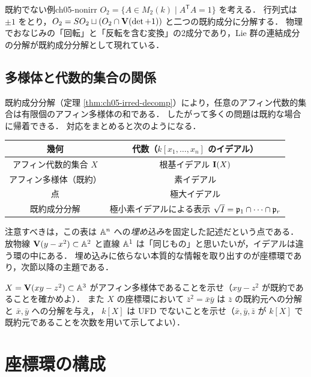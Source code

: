 \begin{myex}{既約でない例}{ch05-nonirr}
$O_2=\{A\in M_2(k)\mid A^{\mathsf T}A=1\}$ を考える．
行列式は $\pm1$ をとり，$O_2=SO_2\sqcup(O_2\cap\mathbf{V}(\det+1))$ と二つの既約成分に分解する．
物理でおなじみの「回転」と「反転を含む変換」の2成分であり，Lie 群の連結成分の分解が既約成分分解として現れている．
\end{myex}

\subsection{多様体と代数的集合の関係}

既約成分分解（定理 \ref{thm:ch05-irred-decomp}）により，任意のアフィン代数的集合は有限個のアフィン多様体の和である．
したがって多くの問題は既約な場合に帰着できる．
対応をまとめると次のようになる．
\begin{center}
\renewcommand{\arraystretch}{1.3}
\begin{tabular}{c|c}
幾何 & 代数（$k[x_1,\dots,x_n]$ のイデアル）\\ \hline
アフィン代数的集合 $X$ & 根基イデアル $\mathbf{I}(X)$\\
アフィン多様体（既約） & 素イデアル\\
点 & 極大イデアル\\
既約成分分解 & 極小素イデアルによる表示 $\sqrt I=\mathfrak{p}_1\cap\dots\cap\mathfrak{p}_r$
\end{tabular}
\end{center}

注意すべきは，この表は $\mathbb{A}^n$ への\emph{埋め込み}を固定した記述だという点である．
放物線 $\mathbf{V}(y-x^2)\subset\mathbb{A}^2$ と直線 $\mathbb{A}^1$ は「同じもの」と思いたいが，イデアルは違う環の中にある．
埋め込みに依らない本質的な情報を取り出すのが座標環であり，次節以降の主題である．

$X=\mathbf{V}(xy-z^2)\subset \mathbb{A}^3$ がアフィン多様体であることを示せ（$xy-z^2$ が既約であることを確かめよ）．
また $X$ の座標環において $\bar z^2=\bar x\bar y$ は $\bar z$ の既約元への分解と $\bar x,\bar y$ への分解を与え，
$k[X]$ は UFD でないことを示せ（$\bar x,\bar y,\bar z$ が $k[X]$ で既約元であることを次数を用いて示してよい）．

\section{座標環の構成}

